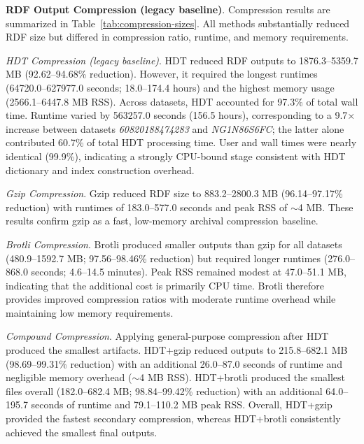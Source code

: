 \documentclass[pdflatex,sn-mathphys-num]{sn-jnl}%
\theoremstyle{thmstyleone}%
\theoremstyle{thmstyletwo}%
\theoremstyle{thmstylethree}%
\begin{document}
\textbf{RDF Output Compression (legacy baseline)}.
Compression results are summarized in Table~\ref{tab:compression-sizes}.
All methods substantially reduced RDF size but differed in compression ratio, runtime, and memory requirements.

\textit{HDT Compression (legacy baseline)}.
HDT reduced RDF outputs to 1876.3--5359.7 MB (92.62--94.68\% reduction).
However, it required the longest runtimes (64720.0--627977.0 seconds; 18.0--174.4 hours) and the highest memory usage (2566.1--6447.8 MB RSS).
Across datasets, HDT accounted for 97.3\% of total wall time.
Runtime varied by 563257.0 seconds (156.5 hours), corresponding to a 9.7$\times$ increase between datasets \textit{60820188474283} and \textit{NG1N86S6FC}; the latter alone contributed 60.7\% of total HDT processing time.
User and wall times were nearly identical (99.9\%), indicating a strongly CPU-bound stage consistent with HDT dictionary and index construction overhead.

\textit{Gzip Compression}.
Gzip reduced RDF size to 883.2--2800.3 MB (96.14--97.17\% reduction) with runtimes of 183.0--577.0 seconds and peak RSS of $\sim$4 MB.
These results confirm gzip as a fast, low-memory archival compression baseline.


\textit{Brotli Compression}.
Brotli produced smaller outputs than gzip for all datasets (480.9--1592.7 MB; 97.56--98.46\% reduction) but required longer runtimes (276.0--868.0 seconds; 4.6--14.5 minutes).
Peak RSS remained modest at 47.0--51.1 MB, indicating that the additional cost is primarily CPU time.
Brotli therefore provides improved compression ratios with moderate runtime overhead while maintaining low memory requirements.


\textit{Compound Compression}.
Applying general-purpose compression after HDT produced the smallest artifacts.
HDT+gzip reduced outputs to 215.8--682.1 MB (98.69--99.31\% reduction) with an additional 26.0--87.0 seconds of runtime and negligible memory overhead ($\sim$4 MB RSS).
HDT+brotli produced the smallest files overall (182.0--682.4 MB; 98.84--99.42\% reduction) with an additional 64.0--195.7 seconds of runtime and 79.1--110.2 MB peak RSS.
Overall, HDT+gzip provided the fastest secondary compression, whereas HDT+brotli consistently achieved the smallest final outputs.
\end{document}
